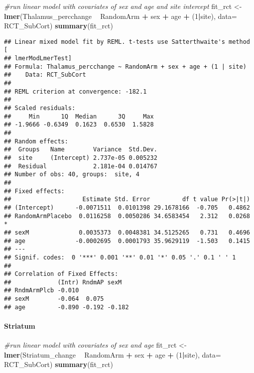 \documentclass[]{article}
\newenvironment{Shaded}{\begin{snugshade}}{\end{snugshade}}
\newcommand{\KeywordTok}[1]{\textcolor[rgb]{0.13,0.29,0.53}{\textbf{#1}}}
\newcommand{\DataTypeTok}[1]{\textcolor[rgb]{0.13,0.29,0.53}{#1}}
\newcommand{\DecValTok}[1]{\textcolor[rgb]{0.00,0.00,0.81}{#1}}
\newcommand{\StringTok}[1]{\textcolor[rgb]{0.31,0.60,0.02}{#1}}
\newcommand{\CommentTok}[1]{\textcolor[rgb]{0.56,0.35,0.01}{\textit{#1}}}
\newcommand{\OperatorTok}[1]{\textcolor[rgb]{0.81,0.36,0.00}{\textbf{#1}}}
\newcommand{\NormalTok}[1]{#1}
\let\oldparagraph\paragraph
\renewcommand{\paragraph}[1]{\oldparagraph{#1}\mbox{}}
\theoremstyle{definition}
\theoremstyle{definition}
\theoremstyle{definition}
\theoremstyle{remark}
\begin{document}
\begin{Shaded}
\begin{Highlighting}[]
\CommentTok{#run linear model with covariates of sex and age and site intercept}
\NormalTok{  fit_rct <-}\StringTok{ }\KeywordTok{lmer}\NormalTok{(Thalamus_percchange }\OperatorTok{~}\StringTok{ }\NormalTok{RandomArm }\OperatorTok{+}\StringTok{ }\NormalTok{sex }\OperatorTok{+}\StringTok{ }\NormalTok{age }\OperatorTok{+}\StringTok{ }\NormalTok{(}\DecValTok{1}\OperatorTok{|}\NormalTok{site), }\DataTypeTok{data=}\NormalTok{ RCT_SubCort)}
  \KeywordTok{summary}\NormalTok{(fit_rct)}
\end{Highlighting}
\end{Shaded}

\begin{verbatim}
## Linear mixed model fit by REML. t-tests use Satterthwaite's method [
## lmerModLmerTest]
## Formula: Thalamus_percchange ~ RandomArm + sex + age + (1 | site)
##    Data: RCT_SubCort
## 
## REML criterion at convergence: -182.1
## 
## Scaled residuals: 
##     Min      1Q  Median      3Q     Max 
## -1.9666 -0.6349  0.1623  0.6530  1.5828 
## 
## Random effects:
##  Groups   Name        Variance  Std.Dev.
##  site     (Intercept) 2.737e-05 0.005232
##  Residual             2.181e-04 0.014767
## Number of obs: 40, groups:  site, 4
## 
## Fixed effects:
##                    Estimate Std. Error         df t value Pr(>|t|)  
## (Intercept)      -0.0071511  0.0101398 29.1678166  -0.705   0.4862  
## RandomArmPlacebo  0.0116258  0.0050286 34.6583454   2.312   0.0268 *
## sexM              0.0035373  0.0048381 34.5125265   0.731   0.4696  
## age              -0.0002695  0.0001793 35.9629119  -1.503   0.1415  
## ---
## Signif. codes:  0 '***' 0.001 '**' 0.01 '*' 0.05 '.' 0.1 ' ' 1
## 
## Correlation of Fixed Effects:
##             (Intr) RndmAP sexM  
## RndmArmPlcb -0.010              
## sexM        -0.064  0.075       
## age         -0.890 -0.192 -0.182
\end{verbatim}

\paragraph{Striatum}\label{striatum}

\begin{Shaded}
\begin{Highlighting}[]
\CommentTok{#run linear model with covariates of sex and age}
\NormalTok{  fit_rct <-}\StringTok{ }\KeywordTok{lmer}\NormalTok{(Striatum_change }\OperatorTok{~}\StringTok{ }\NormalTok{RandomArm }\OperatorTok{+}\StringTok{ }\NormalTok{sex }\OperatorTok{+}\StringTok{ }\NormalTok{age }\OperatorTok{+}\StringTok{ }\NormalTok{(}\DecValTok{1}\OperatorTok{|}\NormalTok{site), }\DataTypeTok{data=}\NormalTok{ RCT_SubCort)}
  \KeywordTok{summary}\NormalTok{(fit_rct)}
\end{Highlighting}
\end{Shaded}
\end{document}
